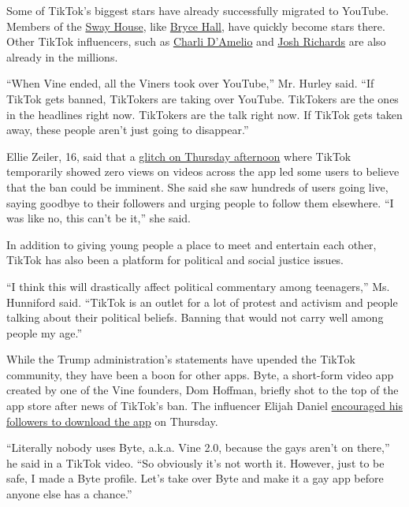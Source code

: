 Some of TikTok's biggest stars have already successfully migrated to
YouTube. Members of the
\href{https://www.nytimes.com/2020/06/08/style/sway-house-neighbors-tiktok.html}{Sway
House}, like
\href{https://www.youtube.com/channel/UCI7IxRdZIn9G0cOUwiozhjw}{Bryce
Hall}, have quickly become stars there. Other TikTok influencers, such
as
\href{https://www.youtube.com/channel/UCi3OE-aN09WOcN9d2stCvPg}{Charli
D'Amelio} and
\href{https://www.youtube.com/channel/UCMhyesTXP5MZO7l2cxv9xKw}{Josh
Richards} are also already in the millions.

``When Vine ended, all the Viners took over YouTube,'' Mr. Hurley said.
``If TikTok gets banned, TikTokers are taking over YouTube. TikTokers
are the ones in the headlines right now. TikTokers are the talk right
now. If TikTok gets taken away, these people aren't just going to
disappear.''

Ellie Zeiler, 16, said that a
\href{https://www.distractify.com/p/why-does-tiktok-have-0-views}{glitch
on Thursday afternoon} where TikTok temporarily showed zero views on
videos across the app led some users to believe that the ban could be
imminent. She said she saw hundreds of users going live, saying goodbye
to their followers and urging people to follow them elsewhere. ``I was
like no, this can't be it,'' she said.

In addition to giving young people a place to meet and entertain each
other, TikTok has also been a platform for political and social justice
issues.

``I think this will drastically affect political commentary among
teenagers,'' Ms. Hunniford said. ``TikTok is an outlet for a lot of
protest and activism and people talking about their political beliefs.
Banning that would not carry well among people my age.''

While the Trump administration's statements have upended the TikTok
community, they have been a boon for other apps. Byte, a short-form
video app created by one of the Vine founders, Dom Hoffman, briefly shot
to the top of the app store after news of TikTok's ban. The influencer
Elijah Daniel
\href{https://www.tiktok.com/@elijahdaniel/video/6847322887607651590}{encouraged
his followers to download the app} on Thursday.

``Literally nobody uses Byte, a.k.a. Vine 2.0, because the gays aren't
on there,'' he said in a TikTok video. ``So obviously it's not worth it.
However, just to be safe, I made a Byte profile. Let's take over Byte
and make it a gay app before anyone else has a chance.''

